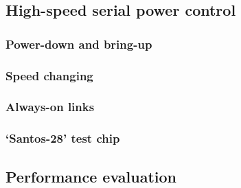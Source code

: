 	\subsection{High-speed serial power control}
		
		
		\subsubsection{Power-down and bring-up}
			
		
		\subsubsection{Speed changing}
			
		
		\subsubsection{Always-on links}
			
		
		\subsubsection{`Santos-28' test chip}
			
	
	
	\subsection{Performance evaluation}
		
